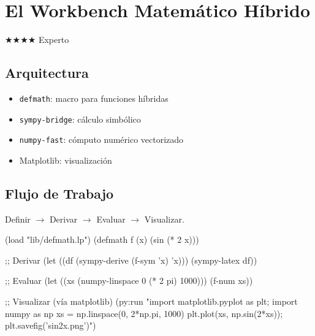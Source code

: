 \chapter{El Workbench Matemático Híbrido}
\label{chap:workbench-intro}
{\huge$\bigstar$}{\huge$\bigstar$}{\huge$\bigstar$}{\huge$\bigstar$} Experto

\section{Arquitectura}
\begin{itemize}
\item \texttt{defmath}: macro para funciones híbridas
\item \texttt{sympy-bridge}: cálculo simbólico
\item \texttt{numpy-fast}: cómputo numérico vectorizado
\item Matplotlib: visualización
\end{itemize}

\section{Flujo de Trabajo}
Definir $\rightarrow$ Derivar $\rightarrow$ Evaluar $\rightarrow$ Visualizar.

\begin{examplebox}[title=Flujo completo]
\begin{lispcode}
(load "lib/defmath.lp")
(defmath f (x) (sin (* 2 x)))

;; Derivar
(let ((df (sympy-derive (f-sym 'x) 'x))) (sympy-latex df))

;; Evaluar
(let ((xs (numpy-linspace 0 (* 2 pi) 1000))) (f-num xs))

;; Visualizar (vía matplotlib)
(py:run "import matplotlib.pyplot as plt; import numpy as np
xs = np.linspace(0, 2*np.pi, 1000)
plt.plot(xs, np.sin(2*xs)); plt.savefig('sin2x.png')")
\end{lispcode}
\end{examplebox}

